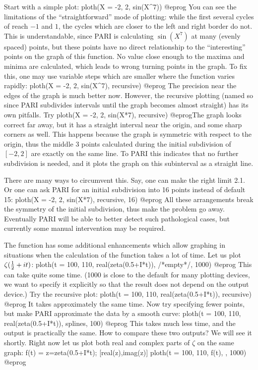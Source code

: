 Start with a simple plot:
\bprog
  ploth(X = -2, 2, sin(X^7))
@eprog\noindent
You can see the limitations of the ``straightforward'' mode of plotting:
while the first several cycles of  reach $-1$ and $1$, the cycles
which are closer to the left and right border do not. This is understandable,
since PARI is calculating $\sin(X^7)$ at many (evenly spaced) points, but
these points have no direct relationship to the ``interesting'' points on
the graph of this function.  No value close enough to the maxima and minima
are calculated, which leads to wrong turning points in the graph. To fix
this, one may use variable steps which are smaller where the function varies
rapidly:
\bprog
  ploth(X = -2, 2, sin(X^7), recursive)
@eprog\noindent
The precision near the edges of the graph is much better now.
However, the recursive plotting (named so since PARI subdivides intervals
until the graph becomes almost straight) has its own pitfalls.  Try
\bprog
  ploth(X = -2, 2, sin(X*7), recursive)
@eprog\noindent The graph looks correct far away, but it has a straight
interval near the origin, and some sharp corners as well.  This happens
because the graph is symmetric with respect to the origin, thus the middle 3
points calculated during the initial subdivision of $[-2,2]$ are exactly on
the same line.  To PARI this indicates that no further subdivision is needed,
and it plots the graph on this subinterval as a straight line.

There are many ways to circumvent this.  Say, one can make the right limit
2.1.  Or one can ask PARI for an initial subdivision into 16 points instead
of default 15:
\bprog
  ploth(X = -2, 2, sin(X*7), recursive, 16)
@eprog\noindent
All these arrangements break the symmetry of the initial subdivision, thus
make the problem go away.  Eventually PARI will be able to better detect such
pathological cases, but currently some manual intervention may be required.

The function  has some additional enhancements which allow
graphing in situations when the calculation of the function takes a lot of
time.  Let us plot $\zeta({1\over 2} + it)$:
\bprog
  ploth(t = 100, 110, real(zeta(0.5+I*t)), /*empty*/, 1000)
@eprog\noindent
This can take quite some time.  (1000 is close to the default for many
plotting devices, we want to specify it explicitly so that the result does
not depend on the output device.)  Try the recursive plot:
\bprog
  ploth(t = 100, 110, real(zeta(0.5+I*t)), recursive)
@eprog\noindent
It takes approximately the same time.  Now try specifying fewer points,
but make PARI approximate the data by a smooth curve:
\bprog
  ploth(t = 100, 110, real(zeta(0.5+I*t)), splines, 100)
@eprog\noindent
This takes much less time, and the output is practically the same.  How to
compare these two outputs?  We will see it shortly.  Right now let us plot
both real and complex parts of $\zeta$ on the same graph:
\bprog
  f(t) = z=zeta(0.5+I*t); [real(z),imag(z)]
  ploth(t = 100, 110, f(t), , 1000)
@eprog

